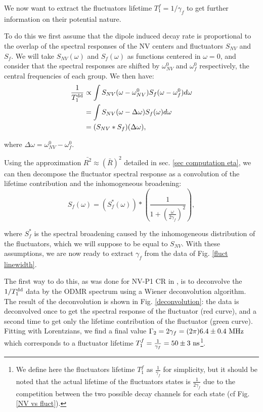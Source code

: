 \documentclass[a4paper, 11pt]{report}
\begin{document}
We now want to extract the fluctuators lifetime $T_1^f=1/\gamma_f$ to get further information on their potential nature. 

To do this we first assume that the dipole induced decay rate is proportional to the overlap of the spectral responses of the NV centers and fluctuators $S_{NV}$ and $S_f$. We will take $S_{NV}( \omega)$ and $S_{f}( \omega)$ as functions centered in $\omega=0$, and consider that the spectral responses are shifted by $\omega^0_{NV}$ and $\omega^0_{f}$ respectively, the central frequencies of each group. We then have:
\begin{align*}
\frac{1}{T_1^{\rm dd}} &\propto \int S_{NV} (\omega-\omega_{NV}^0) S_f (\omega-\omega_{f}^0) d\omega \\
&= \int S_{NV} (\omega-\Delta \omega) S_f (\omega)
 d\omega \\
 &= (S_{NV}*S_{f})(\Delta \omega),
\end{align*}

where $\Delta \omega=\omega_{NV}^0-\omega_{f}^0$.

Using the approximation $\bar {R ^2} \approx (\bar{R})^2$ detailed in sec. \ref{sec computation eta}, we can then decompose the fluctuator spectral response as a convolution of the lifetime contribution and the inhomogeneous broadening:
\begin{equation}
S_{f}(\omega)=\left(S_f^*(\omega)\right)*\left(\frac{1}{1+\left(\frac{\omega}{2 \gamma_f}\right)^2} \right),
\end{equation}

where $S_f^*$ is the spectral broadening caused by the inhomogeneous distribution of the fluctuators, which we will suppose to be equal to $S_{NV}$. With these assumptions, we are now ready to extract $\gamma_f$ from the data of Fig. \ref{fluct linewidth}.

The first way to do this, as was done for NV-P1 CR in \citep{hall2016detection}, is to deconvolve the $1/T_1^{\rm dd}$ data by the ODMR spectrum using a Wiener deconvolution algorithm. The result of the deconvolution is shown in Fig. \ref{deconvolution}: the data is deconvolved once to get the spectral response of the fluctuator (red curve), and a second time to get only the lifetime contribution of the fluctuator (green curve). Fitting with Lorentzians, we find a final value $\Gamma_2 =2\gamma_f= (2\pi) 6.4 \pm 0.4\ \rm MHz$ which corresponds to a fluctuator lifetime $T_1^f=\frac{1}{\gamma_f}=50 \pm 3\ \rm ns$\footnote{We define here the fluctuators lifetime $T_1^f$ as $\frac{1}{\gamma_f}$ for simplicity, but it should be noted that the actual lifetime of the fluctuators states is $\frac{1}{2\gamma_f}$ due to the competition between the two possible decay channels for each state (cf Fig. \ref{NV vs fluct}).}.
\end{document}
